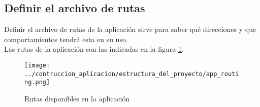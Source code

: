 \subsection{Definir el archivo de rutas}
Definir el archivo de rutas \cite{angular-routing} de la aplicación sirve para saber qué direcciones y que comportamientos tendrá esta en su uso.
\\Las rutas de la aplicación son las indicadas en la figura \ref{rutas_aplicacion}.

\begin{figure}[ht]
    \centering
    \texttt{[image: ../contruccion\_aplicacion/estructura\_del\_proyecto/app\_routing.png]}
    \caption{Rutas disponibles en la aplicación}\label{rutas_aplicacion}
\end{figure}

